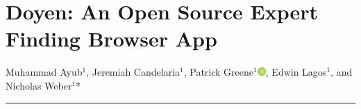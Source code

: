 \documentclass[11pt,twoside]{report} %
\begin{document}

%



\pagebreak





\vfill
\pagebreak





\chapter{Doyen: An Open Source Expert Finding Browser App}
Muhammad Ayub$^{1}$, Jeremiah Candelaria$^{1}$, Patrick Greene$^{1}$\href{https://orcid.org/0000-0001-7052-0608}{\includegraphics[width=0.32cm]{Images/logo-orcid.pdf}}, Edwin Lagos$^{1}$, and Nicholas Weber$^{1}$*
\vspace{0.8cm}
\hrule

 

{
\small

\setlength{\columnsep}{30pt}
\begin{multicols}{2}











\end{multicols}




%





\vfill
\pagebreak
}
\end{document}
